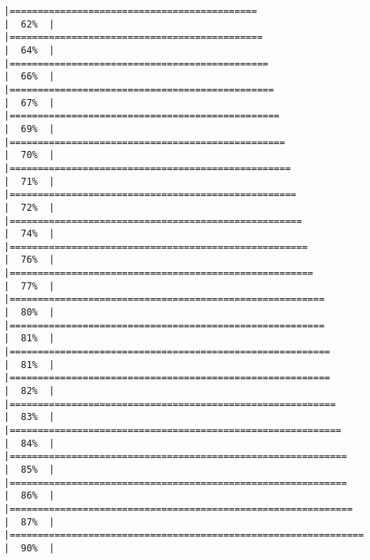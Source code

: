 \documentclass[
]{article}
\begin{document}
\begin{verbatim}
|============================================                          |  62%  |                                                                              |=============================================                         |  64%  |                                                                              |==============================================                        |  66%  |                                                                              |===============================================                       |  67%  |                                                                              |================================================                      |  69%  |                                                                              |=================================================                     |  70%  |                                                                              |==================================================                    |  71%  |                                                                              |===================================================                   |  72%  |                                                                              |====================================================                  |  74%  |                                                                              |=====================================================                 |  76%  |                                                                              |======================================================                |  77%  |                                                                              |========================================================              |  80%  |                                                                              |========================================================              |  81%  |                                                                              |=========================================================             |  81%  |                                                                              |=========================================================             |  82%  |                                                                              |==========================================================            |  83%  |                                                                              |===========================================================           |  84%  |                                                                              |============================================================          |  85%  |                                                                              |============================================================          |  86%  |                                                                              |=============================================================         |  87%  |                                                                              |===============================================================       |  90%  |                                                                              
\end{verbatim}
\end{document}
